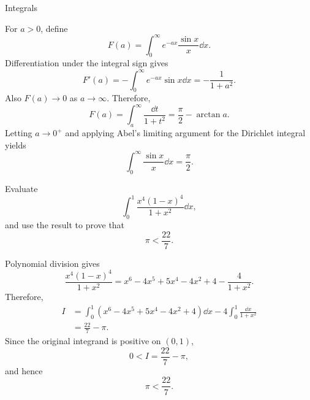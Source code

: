 \begin{expectedproblemgroup}{Integrals}
        \begin{expectedsubsolution}
            For $a>0$, define
            \[
                F(a)
                =
                \int_0^{\infty}e^{-ax}\frac{\sin x}{x}\dd x.
            \]
            Differentiation under the integral sign gives
            \[
                F'(a)
                =
                -\int_0^{\infty}e^{-ax}\sin x\dd x
                =
                -\frac{1}{1+a^2}.
            \]
            Also $F(a)\to0$ as $a\to\infty$. Therefore,
            \[
                F(a)
                =
                \int_a^{\infty}\frac{\dd t}{1+t^2}
                =
                \frac{\pi}{2}-\arctan a.
            \]
            Letting $a\to0^+$ and applying Abel's limiting argument for the
            Dirichlet integral yields
            \[
                \boxed{
                    \int_0^{\infty}\frac{\sin x}{x}\dd x
                    =
                    \frac{\pi}{2}
                }.
            \]
        \end{expectedsubsolution}

        \begin{expectedsubproblem}[1944 Dalzell, On 22/7]
            Evaluate
            \[
                \int_0^1
                \frac{x^4(1-x)^4}{1+x^2}\dd x,
            \]
            and use the result to prove that
            \[
                \pi<\frac{22}{7}.
            \]
        \end{expectedsubproblem}

        \begin{expectedsubsolution}
            Polynomial division gives
            \[
                \frac{x^4(1-x)^4}{1+x^2}
                =
                x^6-4x^5+5x^4-4x^2+4
                -
                \frac{4}{1+x^2}.
            \]
            Therefore,
            \[
                \begin{aligned}
                    I
                    &=
                    \int_0^1
                    \left(x^6-4x^5+5x^4-4x^2+4\right)\dd x
                    -4\int_0^1\frac{\dd x}{1+x^2}\\
                    &=
                    \frac{22}{7}-\pi.
                \end{aligned}
            \]
            Since the original integrand is positive on $(0,1)$,
            \[
                0<I=\frac{22}{7}-\pi,
            \]
            and hence
            \[
                \boxed{\pi<\frac{22}{7}}.
            \]
        \end{expectedsubsolution}


\end{expectedproblemgroup}
